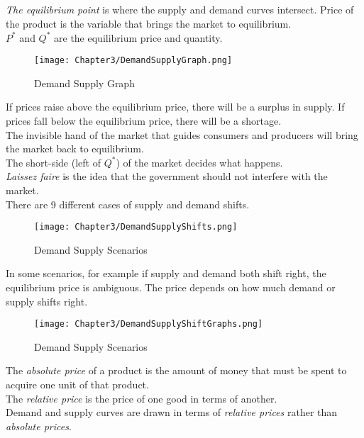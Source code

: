 \subsection{}

\begin{definition}
    \emph{The equilibrium point} is where the supply and demand curves intersect.
    Price of the product is the variable that brings the market to equilibrium.\\
    $P^*$ and $Q^*$ are the equilibrium price and quantity.\\
\end{definition}
\begin{figure}[h!]
    \centering
    \texttt{[image: Chapter3/DemandSupplyGraph.png]}
    \caption{Demand Supply Graph}
\end{figure}
If prices raise above the equilibrium price, there will be a surplus in supply. If prices fall below the equilibrium price, there will be a shortage.\\
The invisible hand of the market that guides consumers and producers will bring the market back to equilibrium.\\
The short-side (left of $Q^*$) of the market decides what happens.\\
\emph{Laissez faire} is the idea that the government should not interfere with the market.\\
There are 9 different cases of supply and demand shifts.\\
\begin{figure}
    \centering
    \texttt{[image: Chapter3/DemandSupplyShifts.png]}
    \caption{Demand Supply Scenarios}
\end{figure}
In some scenarios, for example if supply and demand both shift right, the equilibrium price is ambiguous.
The price depends on how much demand or supply shifts right.\\
\begin{figure}[H]
    \centering
    \texttt{[image: Chapter3/DemandSupplyShiftGraphs.png]}
    \caption{Demand Supply Scenarios}
\end{figure}
The \emph{absolute price} of a product is the amount of money that must be spent to acquire one unit of that product.\\
The \emph{relative price} is the price of one good in terms of another.\\
Demand and supply curves are drawn in terms of \emph{relative prices} rather than \emph{absolute prices}.